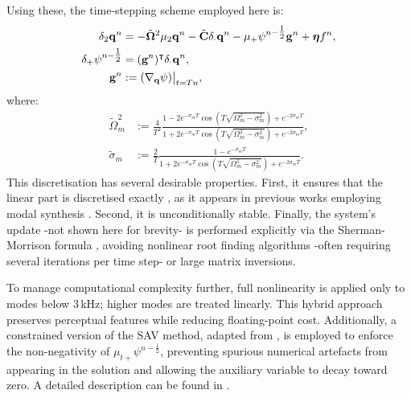 Using these, the time-stepping scheme employed here is:
\begin{align*}
   \delta_2 {\bf q}^n &= -\tilde{\bf \Omega}^2 \mu_2{\bf q}^n - \tilde{\bf C} \delta_\cdot {\bf q}^n - \mu_{+}\psi^{n-\tfrac{1}{2}} {\bf g}^n + {\boldsymbol \eta} f^n, \\
   \delta_{+} \psi^{n-\tfrac{1}{2}} &= ({\bf g}^n)^\intercal \delta_{\cdot} {\bf q}^n, \\
   {\bf g}^n &:= (\nabla_{\bf q} \psi)\big|_{t = Tn},
\end{align*}
where:
\begin{align*}
\tilde \Omega^2_m &:= \frac{4}{T^2}\frac{1-2e^{-\sigma_m T}\cos(T\sqrt{\Omega_m^2-\sigma_m^2})+e^{-2\sigma_m T}}{1+2e^{-\sigma_m T}\cos(T\sqrt{\Omega_m^2-\sigma_m^2})+e^{-2\sigma_m T}}, \\
\tilde \sigma_m &:= \frac{2}{T}\frac{1-e^{-\sigma_m T}}{1+2e^{-\sigma_m T}\cos(T\sqrt{\Omega^2_m-\sigma_m^2})+e^{-2\sigma_m T}}.
\end{align*}
This discretisation has several desirable properties. First, it ensures that the linear part is discretised exactly \cite{cieslinski2011exact}, as it appears in previous works employing modal synthesis \cite{vanWalstijn_DAFX_2016,vanWalstijn_JSV_2024}. Second, it is unconditionally stable. Finally, the system's update -not shown here for brevity- is performed explicitly via the Sherman-Morrison formula \cite{bilbao2023explicit,russo2024scalar,shermanAMS1950}, avoiding nonlinear root finding algorithms -often requiring several iterations per time step- or large matrix inversions.

To manage computational complexity further, full nonlinearity is applied only to modes below 3\,kHz; higher modes are treated linearly. This hybrid approach preserves perceptual features while reducing floating-point cost. Additionally, a constrained version of the SAV method, adapted from \cite{vanWalstijn_JSV_2024}, is employed to enforce the non-negativity of $ \mu_{t+}\psi^{n-\frac{1}{2}}$, preventing spurious numerical artefacts from appearing in the solution and allowing the auxiliary variable to decay toward zero. %
A detailed description can be found in \cite{russo2024guitar, russo2025phd}.







